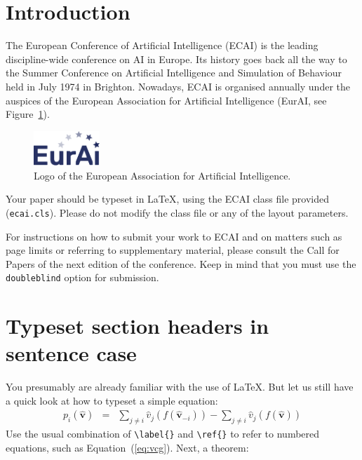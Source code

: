 \documentclass{ecai}
\begin{document}

\section{Introduction}

The European Conference of Artificial Intelligence (ECAI) is the leading
discipline-wide conference on AI in Europe. Its history goes back all
the way to the Summer Conference on Artificial Intelligence and
Simulation of Behaviour held in July 1974 in Brighton. Nowadays, ECAI is
organised annually under the auspices of the European Association for
Artificial Intelligence (EurAI, see Figure~\ref{fig:eurai}).

\begin{figure}[h]
\centering
\includegraphics[width=2.5cm]{eurai}
\caption{Logo of the European Association for Artificial Intelligence.}
\label{fig:eurai}
\end{figure}

Your paper should be typeset in \LaTeX, using the ECAI class file
provided (\texttt{ecai.cls}). Please do not modify the class file or
any of the layout parameters.

For instructions on how to submit your work to ECAI and on matters such
as page limits or referring to supplementary material, please consult
the Call for Papers of the next edition of the conference. Keep in mind
that you must use the \texttt{doubleblind} option for submission.


\section{Typeset section headers in sentence case}

You presumably are already familiar with the use of \LaTeX. But let
us still have a quick look at how to typeset a simple equation:
%
\begin{eqnarray}\label{eq:vcg}
p_i(\boldsymbol{\hat{v}}) & = &
\sum_{j \neq i} \hat{v}_j(f(\boldsymbol{\hat{v}}_{-i})) -
\sum_{j \neq i} \hat{v}_j(f(\boldsymbol{\hat{v}}))
\end{eqnarray}
%
Use the usual combination of \verb|\label{}| and \verb|\ref{}| to
refer to numbered equations, such as Equation~(\ref{eq:vcg}).
Next, a theorem:
\end{document}
